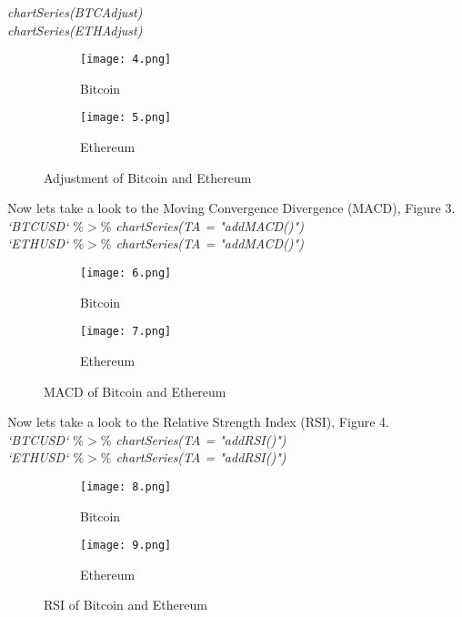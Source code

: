 \documentclass[14pt]{amsart}
\begin{document}
\noindent \textit{chartSeries(BTCAdjust)}\\
\noindent \textit{chartSeries(ETHAdjust)}


\begin{figure}[h!]
  \centering
  \begin{subfigure}[b]{0.4\linewidth}
    \texttt{[image: 4.png]}
    \caption{Bitcoin}
  \end{subfigure}
  \begin{subfigure}[b]{0.4\linewidth}
    \texttt{[image: 5.png]}
    \caption{Ethereum}
  \end{subfigure}
  \caption{Adjustment of Bitcoin and Ethereum}
  \label{fig:coffee}
\end{figure}

Now lets take a look to the Moving Convergence Divergence (MACD), Figure 3.\\

\noindent \textit{`BTCUSD` $\%>\%$ chartSeries(TA = "addMACD()")}\\
\noindent \textit{`ETHUSD` $\%>\%$ chartSeries(TA = "addMACD()")}

\begin{figure}[h!]
  \centering
  \begin{subfigure}[b]{0.4\linewidth}
    \texttt{[image: 6.png]}
    \caption{Bitcoin}
  \end{subfigure}
  \begin{subfigure}[b]{0.4\linewidth}
    \texttt{[image: 7.png]}
    \caption{Ethereum}
  \end{subfigure}
  \caption{MACD of Bitcoin and Ethereum}
  \label{fig:coffee}
\end{figure}

Now lets take a look to the Relative Strength Index (RSI), Figure 4.\\

\noindent \textit{`BTCUSD` $\%>\%$ chartSeries(TA = "addRSI()")}\\
\noindent \textit{`ETHUSD` $\%>\%$ chartSeries(TA = "addRSI()")}

\begin{figure}[h!]
  \centering
  \begin{subfigure}[b]{0.4\linewidth}
    \texttt{[image: 8.png]}
    \caption{Bitcoin}
  \end{subfigure}
  \begin{subfigure}[b]{0.4\linewidth}
    \texttt{[image: 9.png]}
    \caption{Ethereum}
  \end{subfigure}
  \caption{RSI of Bitcoin and Ethereum}
  \label{fig:coffee}
\end{figure}
\end{document}
